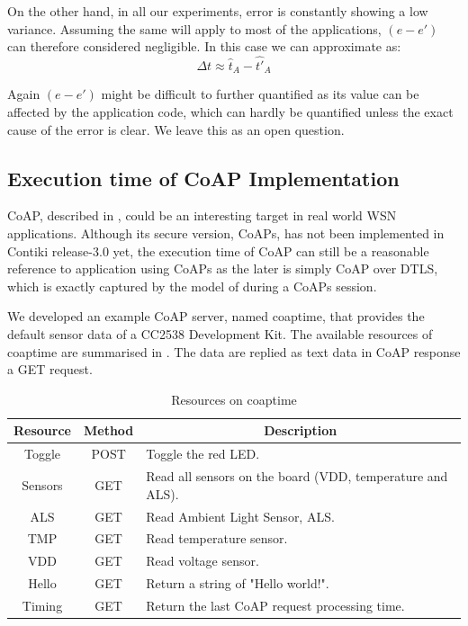 On the other hand,  in all our experiments, error is constantly showing a low variance. Assuming the same will apply to most of the applications, $(e - e')$ can therefore considered negligible. In this case we can approximate  as:
\begin{equation}
	\Delta t \approx  \hat{t}_A - \hat{t'}_A
\end{equation}

Again $(e - e')$ might be difficult to further quantified as its value can be affected by the application code, which can hardly be quantified unless the exact cause of the error is clear. We leave this as an open question.

\subsection{Execution time of CoAP Implementation}

CoAP, described in , could be an interesting target in real world WSN applications. Although its secure version, CoAPs, has not been implemented in Contiki release-3.0 yet, the execution time of CoAP can still be a reasonable reference to application using CoAPs as the later is simply CoAP over DTLS, which is exactly captured by the model of  during a CoAPs session.

We developed an example CoAP server, named coaptime, that provides the default sensor data of a CC2538 Development Kit. The available resources of coaptime are summarised in . The data are replied as text data in CoAP response a GET request.

\begin{table}[ht!]
	\center
	\begin{tabular}{|c|c|l|}
		\hline
		Resource & Method & \multicolumn{1}{c|}{Description}                          \\ \hline
		Toggle   & POST   & Toggle the red LED.                                       \\ \hline
		Sensors  & GET    & Read all sensors on the board (VDD, temperature and ALS). \\ \hline
		ALS      & GET    & Read Ambient Light Sensor, ALS.                           \\ \hline
		TMP      & GET    & Read temperature sensor.                                  \\ \hline
		VDD      & GET    & Read voltage sensor.                                      \\ \hline
		Hello    & GET    & Return a string of "Hello world!".                        \\ \hline
		Timing   & GET    & Return the last CoAP request processing time.             \\ \hline
	\end{tabular}
	\caption{Resources on coaptime}
	\label{Tbl: Resources on coaptime}
\end{table}

